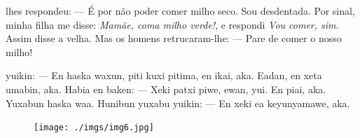 
 lhes respondeu:
--- É por não poder comer milho
seco. Sou desdentada. Por
sinal, minha filha me disse:
\textit{Mamãe, coma milho verde!}, e
respondi \textit{Vou comer, sim}.
Assim disse a velha. Mas os
homens retrucaram-lhe:
--- Pare de comer o nosso milho!

\vspace{2em}

 yuikin:
--- En haska waxun, piti kuxi
pitima, en ikai, aka. Eadan,
en xeta umabin, aka.
Habia en baken:
--- Xeki patxi piwe, ewan,
yui. En piai, aka.
Yuxabun haska waa.
Hunibun yuxabu yuikin:
--- En xeki ea keyunyamawe, aka.

\vspace*{\fill}

\pagebreak
\thispagestyle{empty}
\begin{figure}
\vspace*{-1.6cm}
\hspace*{-2.2cm}\texttt{[image: ./imgs/img6.jpg]}
\end{figure}

\chapter*{}

\mbox{}\vspace*{\fill}



